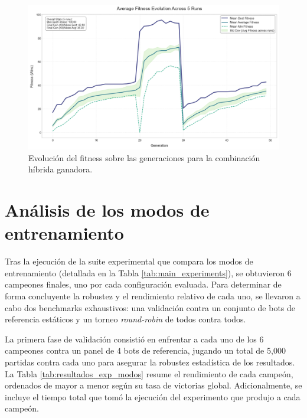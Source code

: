 \begin{figure}[H]
	\centering
	\includegraphics[width=1.0\textwidth]{img/424_fitness_evolution.png}
	\caption{Evolución del fitness sobre las generaciones para la combinación híbrida ganadora.}
	\label{fig:fitness_evolution_424}
\end{figure}

\section{Análisis de los modos de entrenamiento} \label{sec:analisis_modos_entrenamiento}

Tras la ejecución de la suite experimental que compara los modos de entrenamiento (detallada en la Tabla \ref{tab:main_experiments}), se obtuvieron 6 campeones finales, uno por cada configuración evaluada. Para determinar de forma concluyente la robustez y el rendimiento relativo de cada uno, se llevaron a cabo dos benchmarks exhaustivos: una validación contra un conjunto de bots de referencia estáticos y un torneo \textit{round-robin} de todos contra todos.

La primera fase de validación consistió en enfrentar a cada uno de los 6 campeones contra un panel de 4 bots de referencia, jugando un total de 5,000 partidas contra cada uno para asegurar la robustez estadística de los resultados. La Tabla \ref{tab:resultados_exp_modos} resume el rendimiento de cada campeón, ordenados de mayor a menor según su tasa de victorias global. Adicionalmente, se incluye el tiempo total que tomó la ejecución del experimento que produjo a cada campeón.

